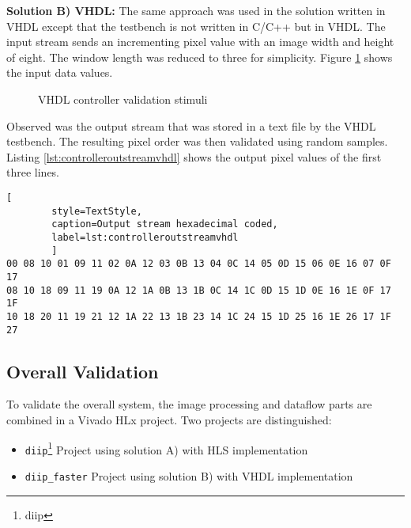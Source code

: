 \vspace{1ex}
\textbf{Solution B) VHDL:} The same approach was used in the solution written in
VHDL except that the testbench is not written in C/C++ but in VHDL. The input
stream sends an incrementing pixel value with an image width and height of
eight. The window length was reduced to three for simplicity. Figure 
\ref{fig:vhdlcontrollerstimuli} shows the input data values.

 \begin{figure}[h!]
    \centering
    \begin{adjustbox}{max width=\linewidth}
        
    \end{adjustbox}
    \caption{VHDL controller validation stimuli}
    \label{fig:vhdlcontrollerstimuli}
\end{figure}

Observed was the output stream that was stored in a text file by the VHDL
testbench. The resulting pixel order was then validated using random samples.
Listing \ref{lst:controlleroutstreamvhdl} shows the output pixel values of the
first three lines.

\begin{minipage}{\linewidth}
    \begin{lstlisting}[
        style=TextStyle, 
        caption=Output stream hexadecimal coded, 
        label=lst:controlleroutstreamvhdl
        ]
00 08 10 01 09 11 02 0A 12 03 0B 13 04 0C 14 05 0D 15 06 0E 16 07 0F 17 
08 10 18 09 11 19 0A 12 1A 0B 13 1B 0C 14 1C 0D 15 1D 0E 16 1E 0F 17 1F
10 18 20 11 19 21 12 1A 22 13 1B 23 14 1C 24 15 1D 25 16 1E 26 17 1F 27\end{lstlisting}
\end{minipage}

%
%
\subsection{Overall Validation}\label{ch:verification:overallvalidation}
To validate the overall system, the image processing and dataflow parts are
combined in a Vivado HLx project. Two projects are distinguished:
\begin{itemize}
    \item \texttt{diip}\footnote{\Gls{diip}} Project using solution A) with HLS
    implementation
    \item \texttt{diip\_faster} Project using solution B) with VHDL
    implementation
\end{itemize}

